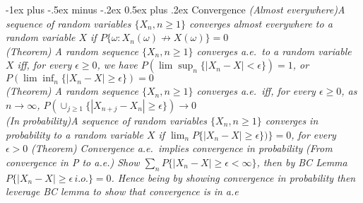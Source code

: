 \documentclass[10pt,landscape]{article}
\makeatletter
\renewcommand{\section}{\@startsection{section}{1}{0mm}%
                                {-1ex plus -.5ex minus -.2ex}%
                                {0.5ex plus .2ex}%
                                {\normalfont\large\bfseries}}
\makeatother
\begin{document}
\begin{multicols*}{3}
\section{Convergence}
\textit{(Almost everywhere)A sequence of random variables $\{X_n,n\geq 1\}$ converges almost everywhere to a random variable $X$ if $P\{\omega:X_{n}(\omega) \not\rightarrow X(\omega)\}=0$}\\
\textit{(Theorem) A random sequence $\{X_n, n\geq1\}$ converges a.e.\ to a random variable $X$ iff, for every $\epsilon\geq0$, we have $P(\lim\sup_n\{|X_n-X|<\epsilon\})=1$, or  $P(\lim\inf_n\{|X_n-X|\geq\epsilon\})=0$}\\
\textit{(Theorem) A random sequence $\{X_n, n\geq1\}$ converges a.e.\ iff, for every $\epsilon\geq0$, as $n\rightarrow \infty$, $P(\cup_{j\geq 1}\{|X_{n+j}-X_n|\geq\epsilon\})\rightarrow0$}\\
\textit{(In probability)A sequence of random variables $\{X_n,n\geq 1\}$ converges in probability to a random variable $X$ if $\lim_n P\{|X_n-X|\geq\epsilon\})\}=0$, for every $\epsilon>0$}
\textit{(Theorem) Convergence a.e.\ implies convergence in probability}
\textit{(From convergence in P to a.e.) Show $\sum_{n}P\{|X_n-X|\geq \epsilon <\infty\}$, then by BC Lemma $P\{|X_n-X|\geq \epsilon \,i.o. \}=0$. Hence being by showing convergence in probability then leverage BC lemma to show that convergence is in a.e} 
\end{multicols*}
\end{document}
